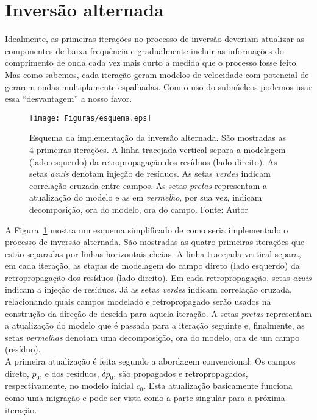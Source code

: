 \newpage
\section{Inversão alternada}
Idealmente, as primeiras iterações no processo de inversão deveriam atualizar as componentes de baixa frequência e gradualmente incluir as informações do comprimento de onda cada vez mais curto a medida que o processo fosse feito. Mas como sabemos, cada iteração geram modelos de velocidade com potencial de gerarem ondas multiplamente espalhadas. Com o uso do subnúcleos podemos usar essa ``desvantagem'' a nosso favor. 

\begin{figure}
  \centering
  \texttt{[image: Figuras/esquema.eps]}
  \caption{Esquema da implementa\c c\~ao da invers\~ao alternada. S\~ao mostradas as 4 primeiras itera\c c\~oes. A linha tracejada vertical separa a modelagem (lado esquerdo) da retropropaga\c c\~ao dos res\'iduos (lado direito). As setas {\color{blue}\emph{azuis}} denotam inje\c c\~ao de res\'iduos. As setas {\color{green}\emph{verdes}} indicam correla\c c\~ao cruzada entre campos. As setas \emph{pretas} representam a atualiza\c c\~ao do modelo e as em {\color{red}\emph{vermelho}}, por sua vez, indicam decomposi\c c\~ao, ora do modelo, ora do campo. Fonte: Autor}
  \label{fig:esquema}
\end{figure}


A Figura~\ref{fig:esquema} mostra um esquema simplificado de como seria implementado o processo de inversão alternada. São mostradas as quatro primeiras iterações que est\~ao separadas por linhas horizontais cheias. A linha tracejada vertical separa, em cada itera\c c\~ao, as etapas de modelagem do campo direto (lado esquerdo) da retropropaga\c c\~ao dos res\'iduos (lado direito). Em cada retropropaga\c c\~ao, setas {\color{blue}\emph{azuis}} indicam a inje\c c\~ao de res\'iduos. J\'a as setas {\color{green}\emph{verdes}} indicam correla\c c\~ao cruzada, relacionando quais campos modelado e retropropagado ser\~ao usados na constru\c c\~ao da dire\c c\~ao de descida para aquela itera\c c\~ao. A setas \emph{pretas} representam a atualiza\c c\~ao do modelo que \'e passada para a itera\c c\~ao seguinte e, finalmente, as setas {\color{red}\emph{vermelhas}} denotam uma decomposi\c c\~ao, ora do modelo, ora de um campo (res\'iduo). \\


A primeira atualiza\c c\~ao \'e feita segundo a abordagem  convencional: Os campos direto, $p_0$, e dos res\'iduos, $\delta p_0$, s\~ao propagados e retropropagados, respectivamente, no modelo inicial $c_0$. Esta atualiza\c c\~ao basicamente funciona como uma migra\c c\~ao e pode ser vista como a parte singular para a pr\'oxima itera\c c\~ao. \\

